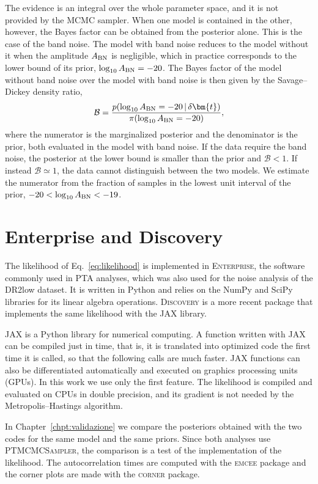 The evidence is an integral over the whole parameter space, and it is not
provided by the MCMC sampler. When one model is contained in the other,
however, the Bayes factor can be obtained from the posterior alone. This is
the case of the band noise. The model with band noise reduces to the model
without it when the amplitude $A_{\rm BN}$ is negligible, which in practice
corresponds to the lower bound of its prior, $\log_{10}A_{\rm BN} = -20$. The
Bayes factor of the model without band noise over the model with band noise
is then given by the Savage--Dickey density ratio,
\begin{equation}
    \mathcal{B} = \frac{p(\log_{10}A_{\rm BN} = -20\,|\,\delta\bm{t})}
    {\pi(\log_{10}A_{\rm BN} = -20)},
    \label{eq:savage_dickey}
\end{equation}
where the numerator is the marginalized posterior and the denominator is the
prior, both evaluated in the model with band noise. If the data require the
band noise, the posterior at the lower bound is smaller than the prior and
$\mathcal{B} < 1$. If instead $\mathcal{B} \simeq 1$, the data cannot
distinguish between the two models. We estimate the numerator from the
fraction of samples in the lowest unit interval of the prior,
$-20 < \log_{10}A_{\rm BN} < -19$.

\section{Enterprise and Discovery} \label{sec:software}

The likelihood of Eq.~\eqref{eq:likelihood} is implemented in
\textsc{Enterprise}, the software commonly used in PTA analyses, which was
also used for the noise analysis of the DR2low dataset. It is written in
Python and relies on the NumPy and SciPy libraries for its linear algebra
operations. \textsc{Discovery} is a more recent package that implements the
same likelihood with the JAX library.

JAX is a Python library for numerical computing. A function written with JAX
can be compiled just in time, that is, it is translated into optimized code the
first time it is called, so that the following calls are much faster. JAX
functions can also be differentiated automatically and executed on graphics
processing units (GPUs). In this work we use only the first feature. The
likelihood is compiled and evaluated on CPUs in double precision, and its
gradient is not needed by the Metropolis--Hastings algorithm.

In Chapter~\ref{chpt:validazione} we compare the posteriors obtained with the
two codes for the same model and the same priors. Since both analyses use
\textsc{PTMCMCSampler}, the comparison is a test of the implementation of the
likelihood. The autocorrelation times are computed with the \textsc{emcee}
package and the corner plots are made with the \textsc{corner} package.